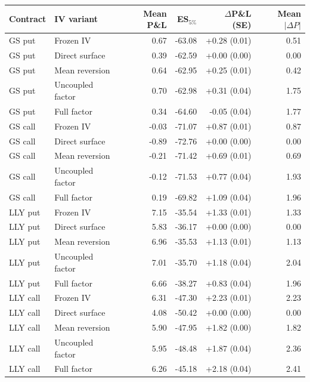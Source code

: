 \begin{tabular}{llrrrr}
\toprule
Contract & IV variant & Mean P\&L & ES$_{5\%}$ & $\Delta$P\&L (SE) & Mean $|\Delta P|$ \\
\midrule
GS put & Frozen IV & 0.67 & -63.08 & +0.28 (0.01) & 0.51 \\
GS put & Direct surface & 0.39 & -62.59 & +0.00 (0.00) & 0.00 \\
GS put & Mean reversion & 0.64 & -62.95 & +0.25 (0.01) & 0.42 \\
GS put & Uncoupled factor & 0.70 & -62.98 & +0.31 (0.04) & 1.75 \\
GS put & Full factor & 0.34 & -64.60 & -0.05 (0.04) & 1.77 \\
\midrule
GS call & Frozen IV & -0.03 & -71.07 & +0.87 (0.01) & 0.87 \\
GS call & Direct surface & -0.89 & -72.76 & +0.00 (0.00) & 0.00 \\
GS call & Mean reversion & -0.21 & -71.42 & +0.69 (0.01) & 0.69 \\
GS call & Uncoupled factor & -0.12 & -71.53 & +0.77 (0.04) & 1.93 \\
GS call & Full factor & 0.19 & -69.82 & +1.09 (0.04) & 1.96 \\
\midrule
LLY put & Frozen IV & 7.15 & -35.54 & +1.33 (0.01) & 1.33 \\
LLY put & Direct surface & 5.83 & -36.17 & +0.00 (0.00) & 0.00 \\
LLY put & Mean reversion & 6.96 & -35.53 & +1.13 (0.01) & 1.13 \\
LLY put & Uncoupled factor & 7.01 & -35.70 & +1.18 (0.04) & 2.04 \\
LLY put & Full factor & 6.66 & -38.27 & +0.83 (0.04) & 1.96 \\
\midrule
LLY call & Frozen IV & 6.31 & -47.30 & +2.23 (0.01) & 2.23 \\
LLY call & Direct surface & 4.08 & -50.42 & +0.00 (0.00) & 0.00 \\
LLY call & Mean reversion & 5.90 & -47.95 & +1.82 (0.00) & 1.82 \\
LLY call & Uncoupled factor & 5.95 & -48.48 & +1.87 (0.04) & 2.36 \\
LLY call & Full factor & 6.26 & -45.18 & +2.18 (0.04) & 2.41 \\
\midrule
\end{tabular}
